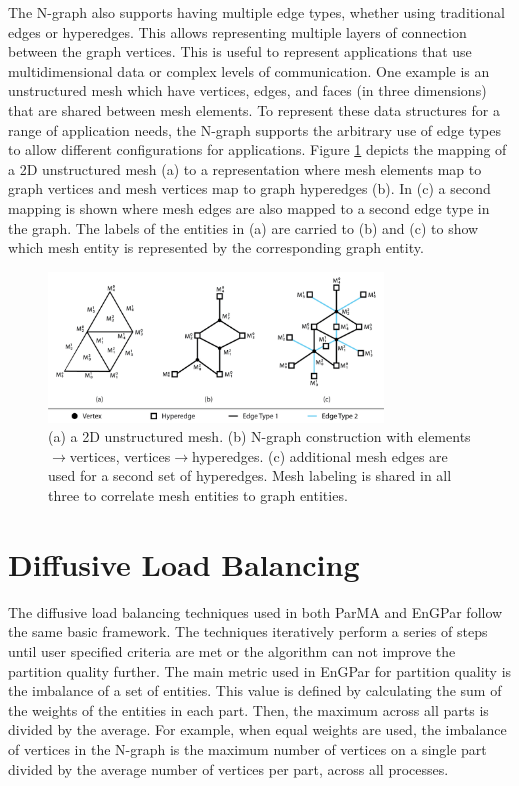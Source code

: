 The N-graph also supports having multiple edge types,
whether using traditional edges or hyperedges. This
allows representing multiple layers of connection
between the graph vertices. This is useful to represent
applications that use multidimensional data or complex
levels of communication. One example is an unstructured
mesh which have vertices,
edges, and faces (in three dimensions) that are shared
between mesh elements. To represent these data
structures for a range of application needs, the
N-graph supports the arbitrary use of edge types to allow
different configurations for applications. Figure
\ref{fig:Mesh2Graph} depicts the mapping of a 2D unstructured mesh (a) to a
representation where mesh elements map to graph vertices and mesh vertices map
to graph hyperedges (b). In (c) a second mapping is shown where mesh edges
are also mapped to a second edge type in the graph. The labels of the entities
in (a) are carried to (b) and (c) to show which mesh entity is represented by
the corresponding graph entity.

\begin{figure}[!ht]
  \centering
  \includegraphics[width=3.5in]{../figures/exampleMesh2Graph.png}
  \caption{(a) a 2D unstructured mesh. (b) N-graph construction with elements$\rightarrow$vertices, vertices$\rightarrow$hyperedges. (c) additional mesh edges are used for a second set of hyperedges. Mesh labeling is shared in all three to correlate mesh entities to graph entities.}
  \label{fig:Mesh2Graph}
\end{figure}


\section{Diffusive Load Balancing}
The diffusive load balancing techniques used in both ParMA and EnGPar follow
the same basic framework. The techniques iteratively perform a series of steps
until user specified criteria are met or the algorithm can not improve
the partition quality further. The main metric used in EnGPar for partition quality is the imbalance of a set of entities. This value is defined by calculating the sum of the weights of the entities in each part. Then, the maximum across all parts is divided by the average. For example, when equal weights are used, the imbalance of vertices in the N-graph is the maximum number of vertices on a single part divided by the average number of vertices per part, across all processes.

